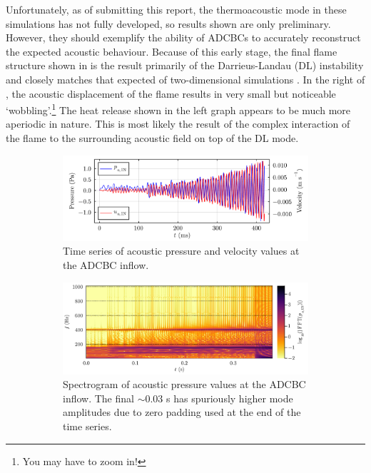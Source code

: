 Unfortunately, as of submitting this report, the thermoacoustic mode in these simulations has not fully developed, so results shown are only preliminary. However, they should exemplify the ability of ADCBCs to accurately reconstruct the expected acoustic behaviour. Because of this early stage, the final flame structure shown in  is the result primarily of the Darrieus-Landau (DL) instability and closely matches that expected of two-dimensional simulations \cite{creta2011StrainRateEffects}. In the right of , the acoustic displacement of the flame results in very small but noticeable `wobbling'.\footnote{You may have to zoom in!} The heat release shown in the left graph appears to be much more aperiodic in nature. This is most likely the result of the complex interaction of the flame to the surrounding acoustic field on top of the DL mode.


\begin{figure}[t]
\begin{subfigure}{0.99\textwidth}
\centering
\includegraphics[scale=0.35]{assets/graphs/2mmx1m_still_pu.pdf}
\caption{Time series of acoustic pressure and velocity values at the ADCBC inflow.}
\label{fig:2mmx1m_still_pu}
\end{subfigure}

\vspace*{0.5em}

\begin{subfigure}{0.99\textwidth}
\centering
\includegraphics[scale=0.35]{assets/graphs/2mmx1m_still_spec2.pdf}
\caption{Spectrogram of acoustic pressure values at the ADCBC inflow. The final $\sim$0.03 s has spuriously higher mode amplitudes due to zero padding used at the end of the time series.}
\label{fig:spectrogram}
\end{subfigure}
\caption{}
\label{fig:in-ac}
\end{figure}

